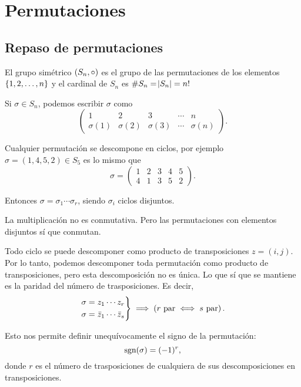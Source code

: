 \chapter{Permutaciones}

\section{Repaso de permutaciones}

El grupo simétrico $\left( S_n, \circ \right)$ es el grupo de las permutaciones de los elementos
$\left\{1, 2, \dots, n\right\}$ y el cardinal de $S_n$ es $\# S_n = \abs{S_n} = n!$

Si $\sigma \in S_n$, podemos escribir $\sigma$ como
\[
    \begin{pmatrix}
        1 & 2 & 3 & \cdots & n \\
        \sigma(1) & \sigma(2) & \sigma(3) & \cdots & \sigma(n)
    \end{pmatrix}.
\]

Cualquier permutación se descompone en ciclos, por ejemplo
$\sigma = (1, 4, 5, 2) \in S_5$ es lo mismo que
\[
    \sigma = 
    \begin{pmatrix}
        1 & 2 & 3 & 4 & 5 \\
        4 & 1 & 3 & 5 & 2
    \end{pmatrix}.
\]

Entonces $\sigma = \sigma_1 \cdots \sigma_r$, siendo $\sigma_i$ ciclos disjuntos.

\begin{obs}
    La multiplicación no es conmutativa. Pero las permutaciones con elementos disjuntos sí que conmutan.
\end{obs}

Todo ciclo se puede descomponer como producto de transposiciones $z = (i, j)$.
Por lo tanto, podemos descomponer toda permutación como producto de transposiciones, pero esta
descomposición no es única.
Lo que sí que se mantiene es la paridad del número de trasposiciones. Es decir,
\[
    \begin{rcases}
        \sigma = z_1 \cdots z_r \\
        \sigma = \bar{z}_1 \cdots \bar{z}_s
    \end{rcases} \implies \left( r \text{ par} \iff s \text{ par}\right).
\]

Esto nos permite definir unequívocamente el signo de la permutación:
\[
    \text{sgn}(\sigma) = (-1)^{r},
\]
donde $r$ es el número de trasposiciones de cualquiera de sus descomposiciones en transposiciones.

